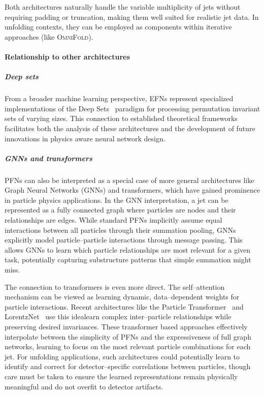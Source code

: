         Both architectures naturally handle the variable multiplicity of jets without requiring padding or truncation, making them well suited for realistic jet data.
        In unfolding contexts, they can be employed as components within iterative approaches (like \textsc{OmniFold}).

        \paragraph{Relationship to other architectures}
            \subparagraph{Deep sets}
                From a broader machine learning perspective, EFNs represent specialized implementations of the Deep Sets~\cite{Sauer2023MeasurementCollider} paradigm for processing permutation invariant sets of varying sizes.
                This connection to established theoretical frameworks facilitates both the analysis of these architectures and the development of future innovations in physics aware neural network design.
            \subparagraph{GNNs and transformers}
            \label{subpar:pfns-gnns-and-transformers}
                    PFNs can also be interpreted as a special case of more general architectures like Graph Neural Networks (GNNs) and transformers, which have gained prominence in particle physics applications.
                    In the GNN interpretation, a jet can be represented as a fully connected graph where particles are nodes and their relationships are edges.
                    While standard PFNs implicitly assume equal interactions between all particles through their summation pooling, GNNs explicitly model particle--particle interactions through message passing.
                    This allows GNNs to learn which particle relationships are most relevant for a given task, potentially capturing substructure patterns that simple summation might miss.
                    
                    The connection to transformers is even more direct.
                    The self--attention mechanism can be viewed as learning dynamic, data--dependent weights for particle interactions.
                    Recent architectures like the Particle Transformer~\cite{Qu2022ParticleTagging} and LorentzNet~\cite{GongAnTagging} use this idealearn complex inter--particle relationships while preserving desired invariances.
                    These transformer based approaches effectively interpolate between the simplicity of PFNs and the expressiveness of full graph networks, learning to focus on the most relevant particle combinations for each jet.
                    For unfolding applications, such architectures could potentially learn to identify and correct for detector--specific correlations between particles, though care must be taken to ensure the learned representations remain physically meaningful and do not overfit to detector artifacts.


